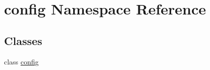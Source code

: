 \hypertarget{namespaceconfig}{}\section{config Namespace Reference}
\label{namespaceconfig}
\subsection*{Classes}
\begin{DoxyCompactItemize}
\item 
class \hyperlink{classconfig_1_1config}{config}
\end{DoxyCompactItemize}
